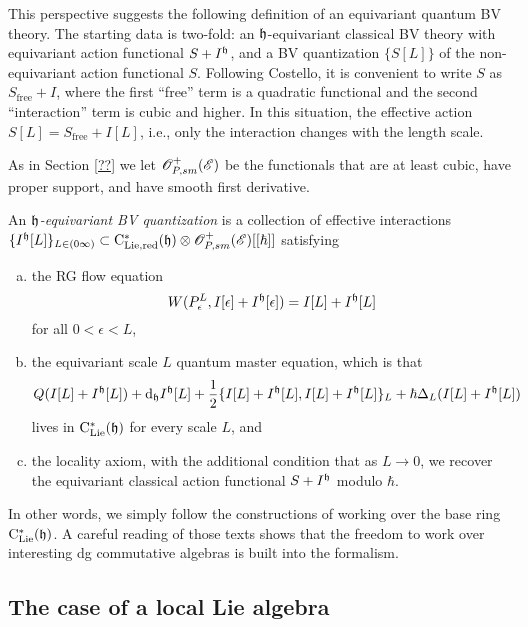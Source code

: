 This perspective suggests the following definition of an equivariant quantum BV theory.
The starting data is two-fold:
an $\mathfrak h$-equivariant classical BV theory with equivariant action functional $S+I^\mathfrak h$, 
and a BV quantization $\{S[L]\}$ of the non-equivariant action functional $S$.
Following Costello, it is convenient to write $S$ as $S_{\text{free}} + I$, 
where the first ``free'' term is a quadratic functional and the second ``interaction'' term is cubic and higher.
In this situation, the effective action $S[L] = S_{\text{free}} + I[L]$, 
i.e., only the interaction changes with the length scale.

As in Section \ref{??} we let $\mathscr O_{P,sm}^+(\mathscr E)$ be the functionals that are at least cubic, have proper support, and have smooth first derivative. 

\begin{dfn} \label{eqQFT} 
An {\em $\mathfrak h$-equivariant BV quantization} is a collection of effective interactions $\{I^\mathfrak h[L]\}_{L \in (0\infty)} \subset {\rm C}_{\rm Lie, red}^*(\mathfrak h) \otimes \mathscr O_{P,sm}^+(\mathscr E)[[\hbar]]$
satisfying
\begin{enumerate}[(a)]
\item the RG flow equation
\[
W(P_\epsilon^L, I[\epsilon]+I^\mathfrak h[\epsilon]) = I[L] + I^\mathfrak h[L]
\]
for all $0 < \epsilon < L$,
\item the equivariant scale $L$ quantum master equation, which is that
\[
Q(I[L]+I^\mathfrak h[L]) + {\rm d}_\mathfrak h I^\mathfrak h[L] + \frac{1}{2}\{I[L]+I^\mathfrak h[L],I[L]+I^\mathfrak h[L]\}_{L} + \hbar \Delta_L(I[L]+I^\mathfrak h[L])
\]
lives in ${\rm C}_{{\rm Lie}}^*(\mathfrak h)$ for every scale $L$, and
\item the locality axiom, with the additional condition that as $L \to 0$, we recover the equivariant classical action functional $S+ I^\mathfrak h$ modulo $\hbar$.
\end{enumerate}
\end{dfn}

In other words, we simply follow the constructions of \cite{CosRenormalization} working over the base ring ${\rm C}_{{\rm Lie}}^*(\mathfrak h)$.
A careful reading of those texts shows that the freedom to work over interesting dg commutative algebras is built into the formalism.

\subsection{The case of a local Lie algebra}\label{sec: local equiv}

